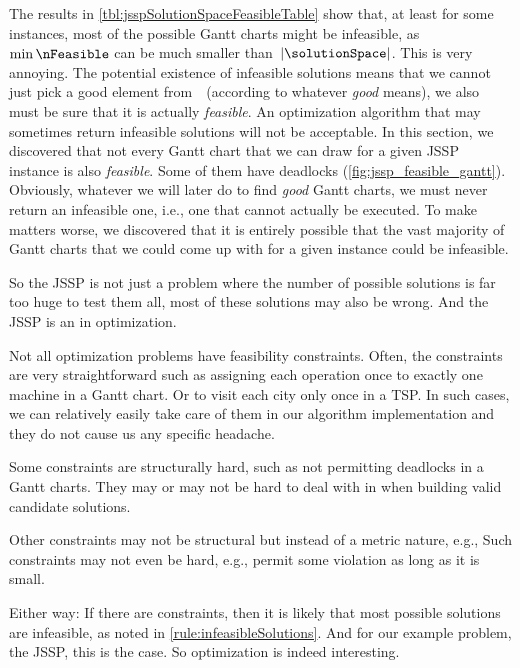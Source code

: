 The results in \autoref{tbl:jsspSolutionSpaceFeasibleTable} show that, at least for some instances, most of the possible Gantt charts might be infeasible, as~$\min\nFeasible$ can be much smaller than~$\left|\solutionSpace\right|$.
%
%
%
This is very annoying.
The potential existence of infeasible solutions means that we cannot just pick a good element from~\solutionSpace\ (according to whatever \emph{good} means), we also must be sure that it is actually \emph{feasible}.
An optimization algorithm that may sometimes return infeasible solutions will not be acceptable.%
%
\endhsection%
%
%
%
In this section, we discovered that not every Gantt chart that we can draw for a given \gls{JSSP} instance is also \emph{feasible}.
Some of them have deadlocks (\ref{fig:jssp_feasible_gantt}).
Obviously, whatever we will later do to find \emph{good} Gantt charts, we must never return an infeasible one, i.e., one that cannot actually be executed.
To make matters worse, we discovered that it is entirely possible that the vast majority of Gantt charts that we could come up with for a given instance could be infeasible.

So the \gls{JSSP} is not just a problem where the number of possible solutions is far too huge to test them all, most of these solutions may also be wrong.
And the \gls{JSSP} is an  in optimization.

Not all optimization problems have feasibility constraints.
Often, the constraints are very straightforward such as assigning each operation once to exactly one machine in a Gantt chart.
Or to visit each city only once in a \gls{TSP}.
In such cases, we can relatively easily take care of them in our algorithm implementation and they do not cause us any specific headache.

Some constraints are structurally hard, such as not permitting deadlocks in a Gantt charts.
They may or may not be hard to deal with in when building valid candidate solutions.

Other constraints may not be structural but instead of a metric nature, e.g., 
Such constraints may not even be hard, e.g., permit some violation as long as it is small.

Either way:
If there are constraints, then it is likely that most possible solutions are infeasible, as noted in \autoref{rule:infeasibleSolutions}.
And for our example problem, the \gls{JSSP}, this is the case.
So optimization is indeed interesting.%
\endhsection%
\endhsection%
%
